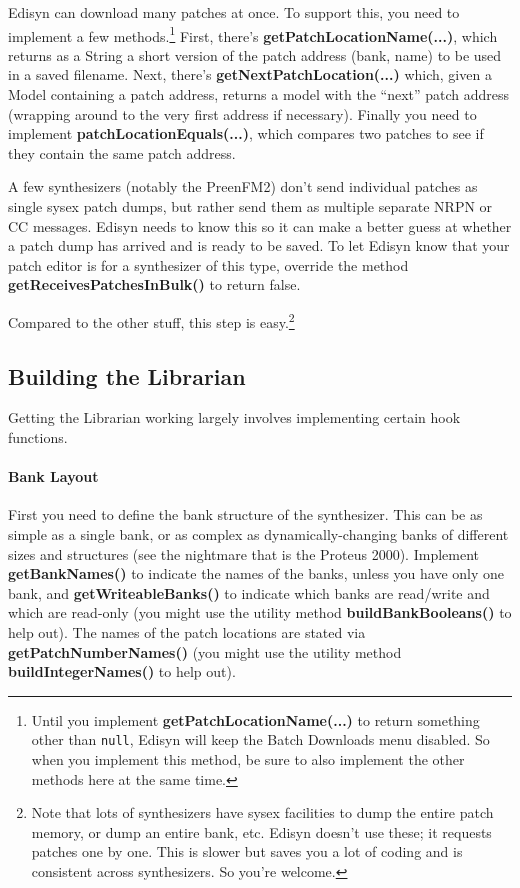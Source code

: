 \documentclass{article}
\begin{document}
Edisyn can download many patches at once.  To support this, you need to implement a few methods.\footnote{Until you implement {\bf getPatchLocationName(...)} to return something other than {\tt null}, Edisyn will keep the Batch Downloads menu disabled.  So when you implement this method, be sure to also implement the other methods here at the same time.} First, there's {\bf getPatchLocationName(...)}, which returns as a String a short version of the patch address (bank, name) to be used in a saved filename.  Next, there's {\bf getNextPatchLocation(...)} which, given a Model containing a patch address, returns a model with the ``next'' patch address (wrapping around to the very first address if necessary).  Finally you need to implement {\bf patchLocationEquals(...)}, which compares two patches to see if they contain the same patch address.
 
A few synthesizers (notably the PreenFM2) don't send individual patches as single sysex patch dumps, but rather send them as multiple separate NRPN or CC messages.  Edisyn needs to know this so it can make a better guess at whether a patch dump has arrived and is ready to be saved.  To let Edisyn know that your patch editor is for a synthesizer of this type, override the method {\bf getReceivesPatchesInBulk()} to return false.

Compared to the other stuff, this step is easy.\footnote{Note that lots of synthesizers have sysex facilities to dump the entire patch memory, or dump an entire bank, etc.  Edisyn doesn't use these; it requests patches one by one.  This is slower but saves you a lot of coding and is consistent across synthesizers.  So you're welcome.}

\subsection{Building the Librarian}

Getting the Librarian working largely involves implementing certain hook functions.  

\paragraph{Bank Layout}

First you need to define the bank structure of the synthesizer.  This can be as simple as a single bank, or as complex as dynamically-changing banks of different sizes and structures (see the nightmare that is the Proteus 2000).  Implement {\bf getBankNames()} to indicate the names of the banks, unless you have only one bank, and {\bf getWriteableBanks()} to indicate which banks are read/write and which are read-only (you might use the utility method {\bf buildBankBooleans()} to help out).  The names of the patch locations are stated via {\bf getPatchNumberNames()} (you might use the utility method {\bf buildIntegerNames()} to help out).  
\end{document}
